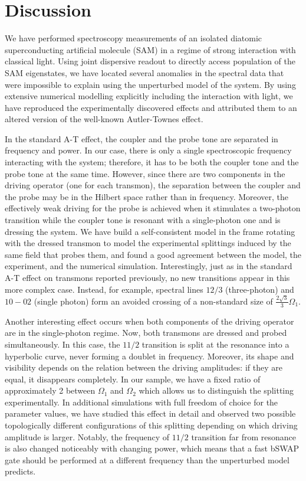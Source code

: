 \documentclass[%
 prx,
 amsmath,amssymb,
 reprint,%
]{revtex4-1}
\begin{document}
\section{Discussion}

We have performed spectroscopy measurements of an isolated diatomic superconducting artificial molecule (SAM) in a regime of strong interaction with classical light. Using joint dispersive readout to directly access population of the SAM eigenstates, we have located several anomalies in the spectral data that were impossible to explain using the unperturbed model of the system. By using extensive numerical modelling explicitly including the interaction with light, we have reproduced the experimentally discovered effects and attributed them to an altered version of the well-known Autler-Townes effect.

In the standard A-T effect, the coupler and the probe tone are separated in frequency and power. In our case, there is only a single spectroscopic frequency interacting with the system; therefore, it has to be both the coupler tone and the probe tone at the same time. However, since there are two components in the driving operator (one for each transmon), the separation between the coupler and the probe may be in the Hilbert space rather than in frequency. Moreover, the effectively weak driving for the probe is achieved when it stimulates a two-photon transition while the coupler tone is resonant with a single-photon one and is dressing the system. We have build a self-consistent model in the frame rotating with the dressed transmon to model the experimental splittings induced by the same field that probes them, and found a good agreement between the model, the experiment, and the numerical simulation. Interestingly, just as in the standard A-T effect on transmons reported previously, no new transitions appear in this more complex case. Instead, for example, spectral lines $12/3$ (three-photon) and $10-02$ (single photon) form an avoided crossing of a non-standard size of $\frac{2\sqrt{3}}{3} \Omega_1$.

Another interesting effect occurs when both components of the driving operator are in the single-photon regime. Now, both transmons are dressed and probed simultaneously. In this case, the $11/2$ transition is split at the resonance into a hyperbolic curve, never forming a doublet in frequency. Moreover, its shape and visibility depends on the relation between the driving amplitudes: if they are equal, it disappears completely. In our sample, we have a fixed ratio of approximately 2 between $\Omega_1$ and $\Omega_2$ which allows us to distinguish the splitting experimentally. In additional simulations with full freedom of choice for the parameter values, we have studied this effect in detail and observed two possible topologically different configurations of this splitting depending on which driving amplitude is larger. Notably, the frequency of $11/2$ transition far from resonance is also changed noticeably with changing power, which means that a fast bSWAP gate should be performed at a different frequency than the unperturbed model predicts. 
\end{document}
